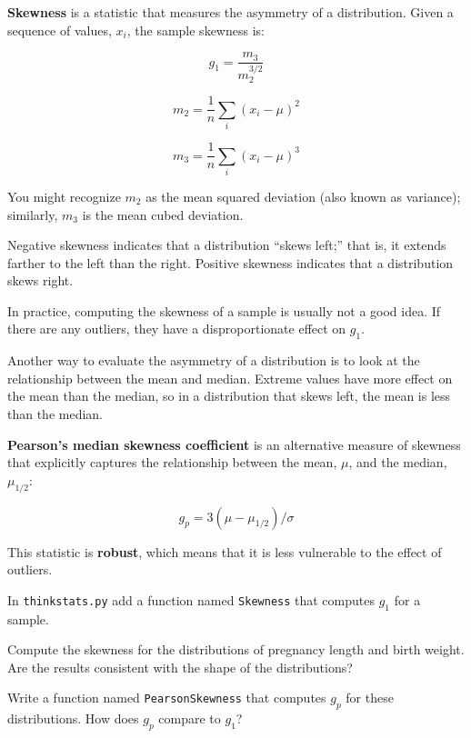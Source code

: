 \documentclass[12pt]{book}
\begin{document}
{\bf Skewness} is a statistic that measures the asymmetry of a
distribution.  Given a sequence of values, $x_i$, the sample skewness
is:

\[ g_1 = \frac{m_3}{m_2^{3/2}}\]

\[ m_2 = \frac{1}{n} \sum_i (x_i - \mu)^2 \]

\[ m_3 = \frac{1}{n} \sum_i (x_i - \mu)^3 \]

You might recognize $m_2$ as the mean squared deviation (also known as
variance); similarly, $m_3$ is the mean cubed deviation.

Negative skewness indicates that a distribution 
``skews left;'' that is, it extends
farther to the left than the right.  Positive skewness indicates
that a distribution skews right.

In practice, computing the skewness of a sample is usually not
a good idea.  If there are any outliers, they
have a disproportionate effect on $g_1$.

Another way to evaluate the asymmetry of a distribution is to look
at the relationship between the mean and median.
Extreme values have more effect on the mean than the median, so
in a distribution that skews left, the mean is less than the median.

{\bf Pearson's median skewness coefficient} is an alternative measure
of skewness that explicitly captures the relationship between the
mean, $\mu$, and the median, $\mu_{1/2}$:

\[ g_p = 3 (\mu - \mu_{1/2}) / \sigma \]

This statistic is {\bf robust}, which means that it is less vulnerable
to the effect of outliers.

\begin{ex}

In {\tt thinkstats.py} add a function named {\tt Skewness} that computes
$g_1$ for a sample.

Compute the skewness for the distributions of pregnancy length and
birth weight.  Are the results consistent with the shape of the
distributions?

Write a function named {\tt PearsonSkewness} that computes $g_p$
for these distributions.  How does $g_p$ compare to $g_1$?

\end{ex}
\end{document}
